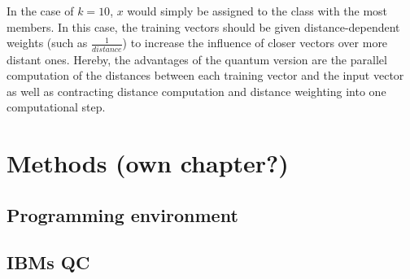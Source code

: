 
In the case of $k = 10$, $x$ would simply be assigned to the class with the most members. In this case, the training vectors should be given distance-dependent weights (such as $\frac{1}{distance}$) to increase the influence of closer vectors over more distant ones. Hereby, the advantages of the quantum version are the parallel computation of the distances between each training vector and the input vector as well as contracting distance computation and distance weighting into one computational step.

\section{Methods (own chapter?)}
\label{subsec:methods}

\subsection{Programming environment}
\label{subsubsec:programming}

\subsection{IBMs QC}
\label{subsubsec:ibmqc}